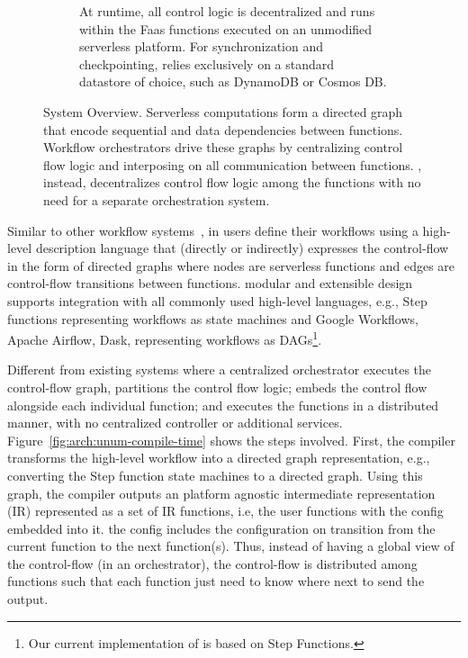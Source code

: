 \begin{figure}[t]
\begin{subfigure}[b]{\columnwidth}
        \caption{At runtime, all \name{} control logic is decentralized and runs within the Faas 
                 functions executed on an unmodified serverless platform. For synchronization and checkpointing, \name{} relies exclusively on a
                standard datastore of choice, such as DynamoDB or Cosmos DB.}
        \label{fig:arch:unum-runtime}
    \end{subfigure}
    \caption{\name{} System Overview. Serverless computations form a directed
            graph that encode sequential and data dependencies between functions. Workflow
            orchestrators drive these graphs by centralizing control flow logic and
            interposing on all communication between functions. \name{},
            instead, decentralizes control flow logic among the functions with
            no need for a separate orchestration system.}
    \label{fig:arch}
\end{figure}


Similar to other workflow systems~\cite{aws-step-functions, google-workflows,
	google-cloud-composer, gg-atc}, in \name{} users define their workflows using
a high-level description language that (directly or indirectly) expresses the
control-flow in the form of directed graphs  where nodes are serverless
functions and edges are control-flow transitions between functions.  modular and extensible design supports integration with all commonly used high-level languages, e.g., Step functions representing workflows as state machines and Google
Workflows, Apache Airflow, Dask, representing workflows as DAGs\footnote{Our current implementation of \name{} is based on Step Functions.}.
%

Different from existing systems where a centralized orchestrator executes
the control-flow graph, \name{} partitions the control flow logic;  embeds the control flow alongside each individual function; and executes the functions in a distributed manner, with no centralized controller or additional services. Figure~\ref{fig:arch:unum-compile-time} shows the steps involved. First, the  \name{} compiler transforms the high-level workflow into a directed graph representation, e.g., converting the Step function state machines to a directed graph. Using this graph, the compiler outputs an platform agnostic intermediate representation (IR) represented as a set of IR functions, i.e, the user functions with the \name{} config embedded into it. the \name{} config includes the configuration on transition from the current function to the next function(s). Thus, instead of having a global view of the control-flow (in an orchestrator), the control-flow is distributed among functions such that each function just need to know where next to send the output. 

